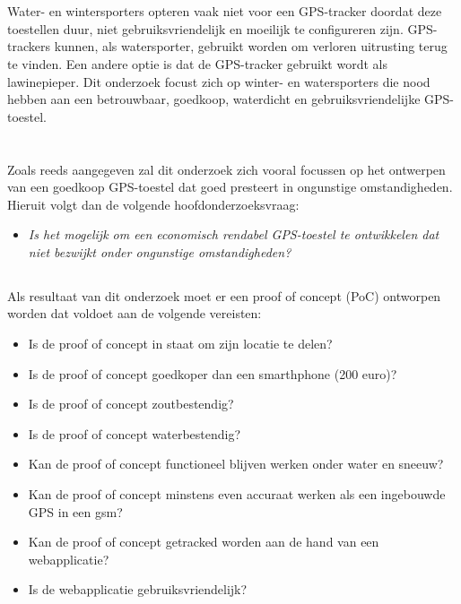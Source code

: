 \section{}
\label{sec:probleemstelling}

 Water- en wintersporters opteren vaak niet voor een GPS-tracker doordat deze toestellen duur, niet gebruiksvriendelijk en moeilijk te configureren zijn. GPS-trackers kunnen, als watersporter, gebruikt worden om verloren uitrusting terug te vinden. Een andere optie is dat de GPS-tracker gebruikt wordt als lawinepieper.  Dit onderzoek focust zich op winter- en watersporters die nood hebben aan een betrouwbaar, goedkoop, waterdicht en gebruiksvriendelijke GPS-toestel.

\section{}
\subsection{}
\label{sec:onderzoeksvraag}

Zoals reeds aangegeven zal dit onderzoek zich vooral focussen op het ontwerpen van een goedkoop GPS-toestel dat goed presteert in ongunstige omstandigheden. Hieruit volgt dan de volgende hoofdonderzoeksvraag:
\newline
\begin{itemize}
	\item[] \textit{Is het mogelijk om een economisch rendabel GPS-toestel te ontwikkelen dat niet bezwijkt onder ongunstige omstandigheden?}
\end{itemize}

\subsection{}
Als resultaat van dit onderzoek moet er een proof of concept (PoC) ontworpen worden dat voldoet aan de volgende vereisten:
\begin{itemize}
	\item Is de proof of concept in staat om zijn locatie te delen?
	\item Is de proof of concept goedkoper dan een smarthphone (200 euro)?
	\item Is de proof of concept zoutbestendig?
	\item  Is de proof of concept waterbestendig?
    \item Kan de proof of concept functioneel blijven werken  onder water en sneeuw?
	\item Kan de proof of concept minstens even accuraat werken als een ingebouwde GPS in een gsm?
	\item Kan de proof of concept getracked worden aan de hand van een webapplicatie?
	\item Is de webapplicatie gebruiksvriendelijk?
\end{itemize}

